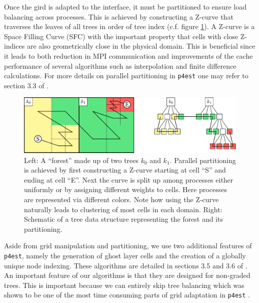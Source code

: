 Once the gird is adapted to the interface, it must be partitioned to ensure load balancing across processes. This is achieved by constructing a Z-curve that traverses the leaves of all trees in order of tree index (c.f. figure \ref{fig:p4est_zcurve}). A Z-curve is a Space Filling Curve (SFC) with the important property that cells with close Z-indices are also geometrically close in the physical domain. This is beneficial since it leads to both reduction in MPI communication and improvements of the cache performance of several algorithms such as interpolation and finite difference calculations. For more details on parallel partitioning in \texttt{p4est} one may refer to section 3.3 of \cite{Burstedde;Wilcox;Ghattas:11:p4est:-Scalable-Algo}.
\begin{figure}[hbtp]
\begin{center}
\includegraphics[width = \columnwidth]{figures/p4est_zcurve.pdf}
\caption{Left: A ``forest'' made up of two trees $k_0$ and $k_1$. Parallel partitioning is achieved by first constructing a Z-curve starting at cell ``S'' and ending at cell ``E''. Next the curve is split up among processes either uniformly or by assigning different weights to cells. Here processes are represented via different colors. Note how using the Z-curve naturally leads to clustering of most cells in each domain. Right: Schematic of a tree data structure representing the forest and its partitioning.}
\label{fig:p4est_zcurve}
\end{center}
\end{figure}
Aside from grid manipulation and partitioning, we use two additional features of \texttt{p4est}, namely the generation of ghost layer cells and the creation of a globally unique node indexing. These algorithms are detailed in sections 3.5 and 3.6 of \cite{Burstedde;Wilcox;Ghattas:11:p4est:-Scalable-Algo}. An important feature of our algorithms is that they are designed for non-graded trees. This is important because we can entirely skip tree balancing which was shown to be one of the most time consuming parts of grid adaptation in \texttt{p4est} \cite{Burstedde;Wilcox;Ghattas:11:p4est:-Scalable-Algo}.


